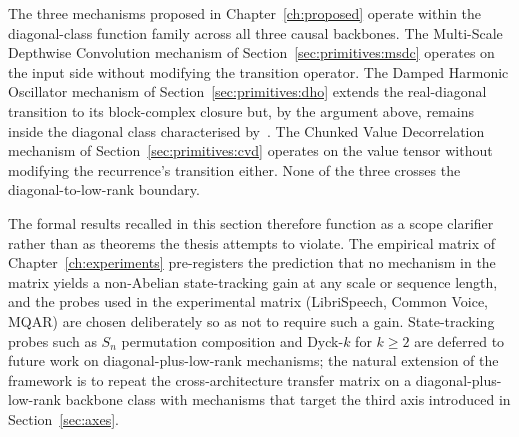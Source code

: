 The three mechanisms proposed in Chapter~\ref{ch:proposed} operate
within the diagonal-class function family across all three causal
backbones. The Multi-Scale Depthwise Convolution mechanism of
Section~\ref{sec:primitives:msdc} operates on the input side without
modifying the transition operator. The Damped Harmonic Oscillator
mechanism of Section~\ref{sec:primitives:dho} extends the
real-diagonal transition to its block-complex closure but, by the
argument above, remains inside the diagonal class characterised
by~\citet{sarrof2024expressive}. The Chunked Value Decorrelation
mechanism of Section~\ref{sec:primitives:cvd} operates on the value
tensor without modifying the recurrence's transition either. None
of the three crosses the diagonal-to-low-rank boundary.

The formal results recalled in this section therefore function as a
scope clarifier rather than as theorems the thesis attempts to
violate. The empirical matrix of Chapter~\ref{ch:experiments}
pre-registers the prediction that no mechanism in the matrix yields
a non-Abelian state-tracking gain at any scale or sequence length,
and the probes used in the experimental matrix (LibriSpeech, Common
Voice, MQAR) are chosen deliberately so as not to require such a
gain. State-tracking probes such as $S_{n}$ permutation composition
and Dyck-$k$ for $k \ge 2$ are deferred to future work on
diagonal-plus-low-rank mechanisms; the natural extension of the
framework is to repeat the cross-architecture transfer matrix on a
diagonal-plus-low-rank backbone class with mechanisms that target
the third axis introduced in Section~\ref{sec:axes}.
